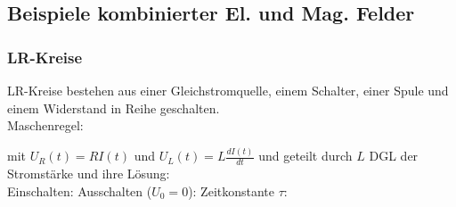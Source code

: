 \subsection{Beispiele kombinierter El. und Mag. Felder}
    \subsubsection{LR-Kreise}
        LR-Kreise bestehen aus einer Gleichstromquelle, einem Schalter, einer Spule und einem Widerstand in Reihe geschalten.\\
        Maschenregel:

        mit $U_R(t) = R I(t)$ und $U_L(t) = L \frac{dI(t)}{dt}$ und geteilt durch $L$
        DGL der Stromstärke und ihre Lösung:\\
        Einschalten:
        Ausschalten ($U_0 = 0$):
        Zeitkonstante $\tau$:
